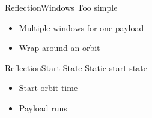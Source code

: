 \begin{frame}{Reflection}{Windows}
	Too simple
	\begin{itemize}
		\item Multiple windows for one payload
		\item Wrap around an orbit
	\end{itemize}
\end{frame}

\begin{frame}{Reflection}{Start State}
	Static start state
	\begin{itemize}
		\item Start orbit time
		\item Payload runs
	\end{itemize}
\end{frame}
